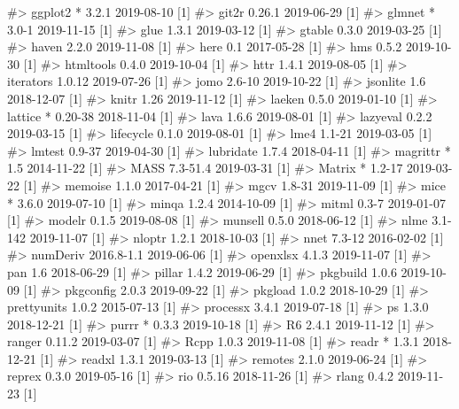 \documentclass[
]{jss}
\begin{document}
\begin{CodeChunk}
\begin{CodeOutput}
#>    ggplot2       * 3.2.1      2019-08-10 [1]
#>    git2r           0.26.1     2019-06-29 [1]
#>    glmnet        * 3.0-1      2019-11-15 [1]
#>    glue            1.3.1      2019-03-12 [1]
#>    gtable          0.3.0      2019-03-25 [1]
#>    haven           2.2.0      2019-11-08 [1]
#>    here            0.1        2017-05-28 [1]
#>    hms             0.5.2      2019-10-30 [1]
#>    htmltools       0.4.0      2019-10-04 [1]
#>    httr            1.4.1      2019-08-05 [1]
#>    iterators       1.0.12     2019-07-26 [1]
#>    jomo            2.6-10     2019-10-22 [1]
#>    jsonlite        1.6        2018-12-07 [1]
#>    knitr           1.26       2019-11-12 [1]
#>    laeken          0.5.0      2019-01-10 [1]
#>    lattice       * 0.20-38    2018-11-04 [1]
#>    lava            1.6.6      2019-08-01 [1]
#>    lazyeval        0.2.2      2019-03-15 [1]
#>    lifecycle       0.1.0      2019-08-01 [1]
#>    lme4            1.1-21     2019-03-05 [1]
#>    lmtest          0.9-37     2019-04-30 [1]
#>    lubridate       1.7.4      2018-04-11 [1]
#>    magrittr      * 1.5        2014-11-22 [1]
#>    MASS            7.3-51.4   2019-03-31 [1]
#>    Matrix        * 1.2-17     2019-03-22 [1]
#>    memoise         1.1.0      2017-04-21 [1]
#>    mgcv            1.8-31     2019-11-09 [1]
#>    mice          * 3.6.0      2019-07-10 [1]
#>    minqa           1.2.4      2014-10-09 [1]
#>    mitml           0.3-7      2019-01-07 [1]
#>    modelr          0.1.5      2019-08-08 [1]
#>    munsell         0.5.0      2018-06-12 [1]
#>    nlme            3.1-142    2019-11-07 [1]
#>    nloptr          1.2.1      2018-10-03 [1]
#>    nnet            7.3-12     2016-02-02 [1]
#>    numDeriv        2016.8-1.1 2019-06-06 [1]
#>    openxlsx        4.1.3      2019-11-07 [1]
#>    pan             1.6        2018-06-29 [1]
#>    pillar          1.4.2      2019-06-29 [1]
#>    pkgbuild        1.0.6      2019-10-09 [1]
#>    pkgconfig       2.0.3      2019-09-22 [1]
#>    pkgload         1.0.2      2018-10-29 [1]
#>    prettyunits     1.0.2      2015-07-13 [1]
#>    processx        3.4.1      2019-07-18 [1]
#>    ps              1.3.0      2018-12-21 [1]
#>    purrr         * 0.3.3      2019-10-18 [1]
#>    R6              2.4.1      2019-11-12 [1]
#>    ranger          0.11.2     2019-03-07 [1]
#>    Rcpp            1.0.3      2019-11-08 [1]
#>    readr         * 1.3.1      2018-12-21 [1]
#>    readxl          1.3.1      2019-03-13 [1]
#>    remotes         2.1.0      2019-06-24 [1]
#>    reprex          0.3.0      2019-05-16 [1]
#>    rio             0.5.16     2018-11-26 [1]
#>    rlang           0.4.2      2019-11-23 [1]

\end{CodeOutput}
\end{CodeChunk}
\end{document}
